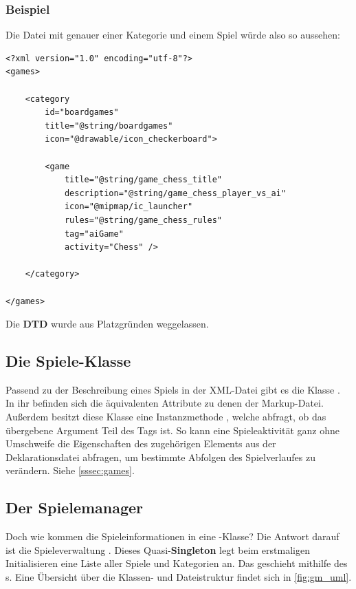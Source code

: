 \subsubsection{Beispiel}

Die Datei mit genauer einer Kategorie und einem Spiel würde also so aussehen:

\begin{lstlisting}
<?xml version="1.0" encoding="utf-8"?>
<games>

    <category
        id="boardgames"
        title="@string/boardgames"
        icon="@drawable/icon_checkerboard">

        <game
            title="@string/game_chess_title"
            description="@string/game_chess_player_vs_ai"
            icon="@mipmap/ic_launcher"
            rules="@string/game_chess_rules"
            tag="aiGame"
            activity="Chess" />

    </category>

</games>
\end{lstlisting}

Die \textbf{DTD} wurde aus Platzgründen weggelassen.

\subsection{Die Spiele-Klasse}

Passend zu der Beschreibung eines Spiels in der XML-Datei gibt es die Klasse
. In ihr befinden sich die äquivalenten Attribute zu denen der
Markup-Datei. Außerdem besitzt diese Klasse eine Instanzmethode , welche abfragt, ob das übergebene Argument Teil des
Tags ist. So kann eine Spieleaktivität ganz ohne Umschweife die Eigenschaften
des zugehörigen Elements aus der Deklarationsdatei abfragen, um bestimmte
Abfolgen des Spielverlaufes zu verändern. Siehe \autoref{sssec:games}.

\subsection{Der Spielemanager}

Doch wie kommen die Spieleinformationen in eine -Klasse? Die Antwort
darauf ist die Spieleverwaltung . Dieses Quasi-\textbf{Singleton}
legt beim erstmaligen Initialisieren eine Liste aller Spiele und Kategorien an.
Das geschieht mithilfe des s. Eine Übersicht über die
Klassen- und Dateistruktur findet sich in \autoref{fig:gm_uml}. 

